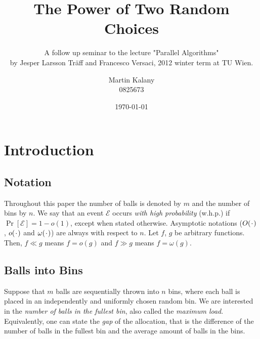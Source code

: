 \documentclass{acm_proc_article-sp}
\newcommand*{\PH}{\makebox[1ex]{\textbf{$\cdot$}}}
\begin{document}
\title{The Power of Two Random Choices}
\subtitle{\large A follow up seminar to the lecture "Parallel Algorithms"\\ by Jesper Larsson Tr\"aff and Francesco Versaci, 2012 winter term at TU Wien.}

\author{
\alignauthor
Martin Kalany\\
       0825673
}    
\date{\today}

\maketitle
\begin{abstract}

\end{abstract}


\section{Introduction}
\label{sec:intro}

\subsection{Notation}
\label{sec:notation}
Throughout this paper the number of balls is denoted by $m$ and the number of bins by $n$. We say that an event $\mathcal E$ occurs \emph{with high probability} (w.h.p.) if $\Pr\left[\mathcal E \right] = 1 - o(1)$, except when stated otherwise. Asymptotic notations ($O(\PH)$, $o(\PH)$ and $\omega(\PH)$) are always with respect to $n$. Let $f$, $g$ be arbitrary functions. Then, $f \ll g$ means $f = o(g)$ and $ f \gg g$ means $f = \omega(g)$.

\subsection{Balls into Bins}
\label{sec:ballsIntoBins}
Suppose that $m$ balls are sequentially thrown into $n$ bins, where each ball is placed in an independently and uniformly chosen random bin. We are interested in the \emph{number of balls in the fullest bin}, also called the \emph{maximum load}. Equivalently, one can state the \emph{gap} of the allocation, that is the difference of the number of balls in the fullest bin and the average amount of balls in the bins. 
\end{document}
